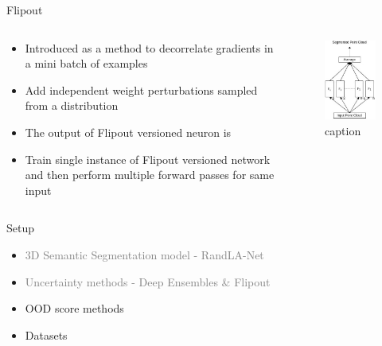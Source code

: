 \documentclass[aspectratio=169]{beamer}
\begin{document}
\begin{frame}{Flipout}
    \begin{columns}
        \begin{column}{0.5\textwidth}
            \begin{itemize}
                \item Introduced as a method to decorrelate gradients in a mini batch of examples
                \item Add independent weight perturbations sampled from a distribution
                \item The output of Flipout versioned neuron is 
                
                \item Train single instance of Flipout versioned network and then perform multiple forward passes for same input
            \end{itemize}
        \end{column}
        \begin{column}{0.5\textwidth}
            \begin{figure}
                \centering
                \includegraphics[scale=0.5]{images/flipout.jpg}
                \caption{caption}
                \label{fig:flipout_work}
            \end{figure}
        \end{column}
    \end{columns}
\end{frame}
\begin{frame}[noframenumbering]{Setup}
    \begin{itemize}
        
        \item \textcolor{gray}{3D Semantic Segmentation model - RandLA-Net}
        \item \textcolor{gray}{Uncertainty methods - Deep Ensembles \& Flipout}
        \item OOD score methods
        \item Datasets
    \end{itemize}
\end{frame}
\end{document}
